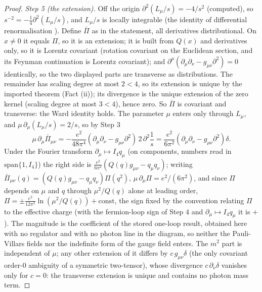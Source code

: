 \begin{proof}
\emph{Step 5 (the extension).} Off the origin $\partial^{2}(L_{\mu}/s) = -4/s^{2}$ (computed), so $s^{-2} = -\frac14\partial^{2}(L_{\mu}/s)$, and $L_{\mu}/s$ is locally integrable (the identity of differential renormalisation \cite{FreedmanJohnsonLatorre1992}). Define $\bar\Pi$ as in the statement, all derivatives distributional. On $x \neq 0$ it equals $\Pi$, so it is an extension; it is built from $Q(x)$ and derivatives only, so it is Lorentz covariant (rotation covariant on the Euclidean section, and its Feynman continuation is Lorentz covariant); and $\partial^{\mu}(\partial_{\mu}\partial_{\nu} - g_{\mu\nu}\partial^{2}) = 0$ identically, so the two displayed parts are transverse as distributions. The remainder has scaling degree at most $2 < 4$, so its extension is unique by the imported theorem \cite{BrunettiFredenhagen2000} (Fact (ii)); its divergence is the unique extension of the zero kernel (scaling degree at most $3 < 4$), hence zero. So $\bar\Pi$ is covariant and transverse: the Ward identity holds. The parameter $\mu$ enters only through $L_{\mu}$, and $\mu\,\partial_{\mu}(L_{\mu}/s) = 2/s$, so by Step 3
\[
\mu\,\partial_{\mu}\bar\Pi_{\mu\nu} = -\frac{e^{2}}{48\pi^{4}}(\partial_{\mu}\partial_{\nu} - g_{\mu\nu}\partial^{2})\,2\,\partial^{2}\frac1s = \frac{e^{2}}{6\pi^{2}}(\partial_{\mu}\partial_{\nu} - g_{\mu\nu}\partial^{2})\delta .
\]
Under the Fourier transform $\partial_{\mu} \mapsto I_{4}q_{\mu}$ (on components, numbers read in $\mathrm{span}\{1, I_{4}\}$) the right side is $\frac{e^{2}}{6\pi^{2}}(Q(q)g_{\mu\nu} - q_{\mu}q_{\nu})$; writing $\bar\Pi_{\mu\nu}(q) = (Q(q)g_{\mu\nu} - q_{\mu}q_{\nu})\Pi(q^{2})$, $\mu\,\partial_{\mu}\Pi = e^{2}/(6\pi^{2})$, and since $\Pi$ depends on $\mu$ and $q$ through $\mu^{2}/Q(q)$ alone at leading order, $\Pi = \pm\frac{e^{2}}{12\pi^{2}}\ln(\mu^{2}/Q(q)) + \text{const}$, the sign fixed by the convention relating $\Pi$ to the effective charge (with the fermion-loop sign of Step 4 and $\partial_{\mu} \mapsto I_{4}q_{\mu}$ it is $+$). The magnitude is the coefficient of the stored one-loop result, obtained here with no regulator and with no photon line in the diagram, so neither the Pauli-Villars fields nor the indefinite form of the gauge field enters. The $m^{2}$ part is independent of $\mu$; any other extension of it differs by $c\,g_{\mu\nu}\delta$ (the only covariant order-$0$ ambiguity of a symmetric two-tensor), whose divergence $c\,\partial_{\nu}\delta$ vanishes only for $c = 0$: the transverse extension is unique and contains no photon mass term.


\end{proof}
